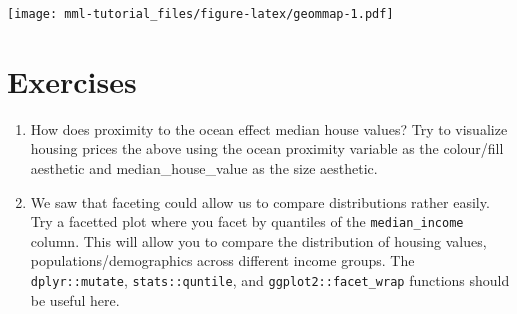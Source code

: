 \documentclass[]{book}
\newenvironment{Shaded}{\begin{snugshade}}{\end{snugshade}}
\newcommand{\KeywordTok}[1]{\textcolor[rgb]{0.13,0.29,0.53}{\textbf{#1}}}
\newcommand{\DataTypeTok}[1]{\textcolor[rgb]{0.13,0.29,0.53}{#1}}
\newcommand{\FloatTok}[1]{\textcolor[rgb]{0.00,0.00,0.81}{#1}}
\newcommand{\StringTok}[1]{\textcolor[rgb]{0.31,0.60,0.02}{#1}}
\newcommand{\OperatorTok}[1]{\textcolor[rgb]{0.81,0.36,0.00}{\textbf{#1}}}
\newcommand{\NormalTok}[1]{#1}
\providecommand{\tightlist}{%
  \setlength{\itemsep}{0pt}\setlength{\parskip}{0pt}}
\theoremstyle{definition}
\theoremstyle{definition}
\theoremstyle{definition}
\theoremstyle{remark}
\begin{document}
\begin{Shaded}
\end{Shaded}

\texttt{[image: mml-tutorial\_files/figure-latex/geommap-1.pdf]}

\section{Exercises}\label{exercises}

\begin{enumerate}
\def\labelenumi{\arabic{enumi}.}
\tightlist
\item
  How does proximity to the ocean effect median house values? Try to
  visualize housing prices the above using the ocean proximity variable
  as the colour/fill aesthetic and median\_house\_value as the size
  aesthetic.
\item
  We saw that faceting could allow us to compare distributions rather
  easily. Try a facetted plot where you facet by quantiles of the
  \texttt{median\_income} column. This will allow you to compare the
  distribution of housing values, populations/demographics across
  different income groups. The \texttt{dplyr::mutate},
  \texttt{stats::quntile}, and \texttt{ggplot2::facet\_wrap} functions
  should be useful here.
\end{enumerate}
\end{document}
